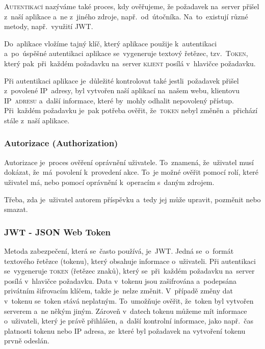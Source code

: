 \documentclass[14pt,a4paper]{article}
\begin{document}
            \textsc{Autentikací} nazýváme také proces, kdy ověřujeme, že požadavek na~server přišel z~naší aplikace a~ne z~jiného zdroje,
            např.~od~útočníka. Na~to~existují různé metody, např.~využití \textsc{JWT}.

            Do~aplikace vložíme tajný klíč, který aplikace použije k~autentikaci a~po~úspěšné autentikaci aplikace se~vygeneruje textový řetězec, tzv.~\textsc{Token}, který pak~při~každém požadavku na~server \textsc{klient} posílá v~hlavičce požadavku.

            Při autentikaci aplikace je~důležité kontrolovat také jestli~požadavek přišel z~povolené IP~adresy, byl vytvořen naší aplikací na~našem webu, klientovu \textsc{IP~adresu} a~další informace, které by~mohly odhalit nepovolený přístup. Při~každém požadavku je~pak potřeba ověřit, že~\textsc{token} nebyl změněn a~přichází stále z~naší aplikace. \parencite{graham2021ethical}

            \subsubsection{Autorizace (Authorization)}
            Autorizace je~proces ověření oprávnění uživatele. To~znamená, že~uživatel musí dokázat, že~má~povolení k~provedení akce.
            To~je možné ověřit pomocí rolí, které uživatel má, nebo pomocí oprávnění k~operacím s~daným zdrojem.

            Třeba, zda je~uživatel autorem příspěvku a~tedy jej může upravit, pozměnit nebo smazat.\parencite{graham2021ethical}

            \subsubsection{JWT - JSON Web Token}
            Metoda zabezpečení, která se~často používá, je~JWT. Jedná se~o~formát textového řetězce (tokenu), který obsahuje informace o~uživateli.
            Při autentikaci se~vygeneruje \textsc{token} (řetězec znaků), který se~při~každém požadavku na~server posílá v~hlavičce požadavku.
            Data v~tokenu jsou zašifrována a~podepsána privátním šifrovacím klíčem, takže je~nelze změnit. V~případě změny dat v~tokenu se~token stává neplatným.
            To~umožňuje ověřit, že~token byl vytvořen serverem a~ne někým jiným. Zároveň v~datech tokenu můžeme mít informace o~uživateli, který je právě přihlášen,
            a~další kontrolní informace, jako např.~čas platnosti tokenu nebo IP adresa, ze~které byl požadavek na vytvoření tokenu prvně odeslán.
\end{document}
